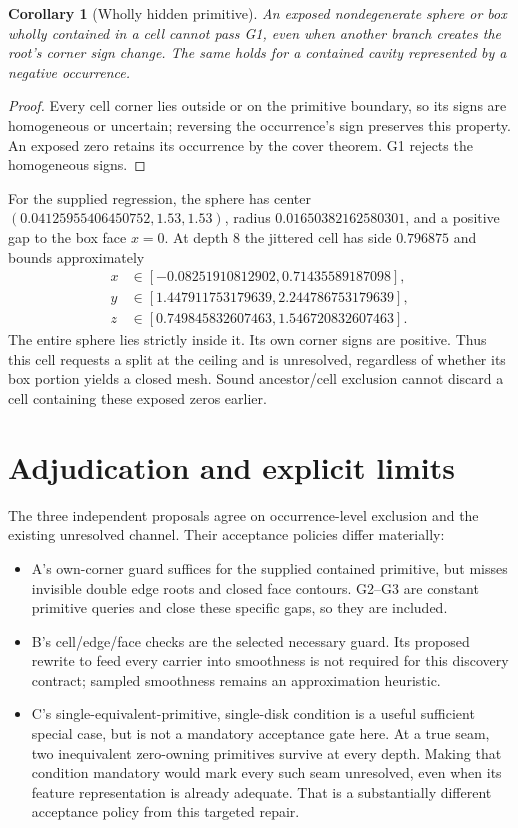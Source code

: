 \documentclass[11pt]{article}
\newtheorem{corollary}[theorem]{Corollary}
\begin{document}
\begin{corollary}[Wholly hidden primitive]
An exposed nondegenerate sphere or box wholly contained in a cell cannot pass
G1, even when another branch creates the root's corner sign change. The same
holds for a contained cavity represented by a negative occurrence.
\end{corollary}
\begin{proof}
Every cell corner lies outside or on the primitive boundary, so its signs
are homogeneous or uncertain; reversing the occurrence's sign preserves this
property. An exposed zero retains its occurrence
by the cover theorem. G1 rejects the homogeneous signs.
\end{proof}

For the supplied regression, the sphere has center
\((0.04125955406450752,1.53,1.53)\), radius
\(0.01650382162580301\), and a positive gap to the box face \(x=0\).
At depth 8 the jittered cell has side \(0.796875\) and bounds approximately
\[
\begin{aligned}
 x&\in[-0.08251910812902,0.71435589187098],\\
 y&\in[1.447911753179639,2.244786753179639],\\
 z&\in[0.749845832607463,1.546720832607463].
\end{aligned}
\]
The entire sphere lies strictly inside it. Its own corner signs are positive.
Thus this cell requests a split at the ceiling and is unresolved, regardless
of whether its box portion yields a closed mesh. Sound ancestor/cell exclusion
cannot discard a cell containing these exposed zeros earlier.

\section{Adjudication and explicit limits}\label{sec:limits}

The three independent proposals agree on occurrence-level exclusion and the
existing unresolved channel. Their acceptance policies differ materially:
\begin{itemize}
\item A's own-corner guard suffices for the supplied contained primitive, but
misses invisible double edge roots and closed face contours. G2--G3 are
constant primitive queries and close these specific gaps, so they are included.
\item B's cell/edge/face checks are the selected necessary guard. Its proposed
rewrite to feed every carrier into smoothness is not required for this
discovery contract; sampled smoothness remains an approximation heuristic.
\item C's single-equivalent-primitive, single-disk condition is a useful
sufficient special case, but is not a mandatory acceptance gate here. At a true
seam, two inequivalent zero-owning primitives survive at every depth. Making
that condition mandatory would mark every such seam unresolved, even when its
feature representation is already adequate. That is a substantially different
acceptance policy from this targeted repair.
\end{itemize}
\end{document}
